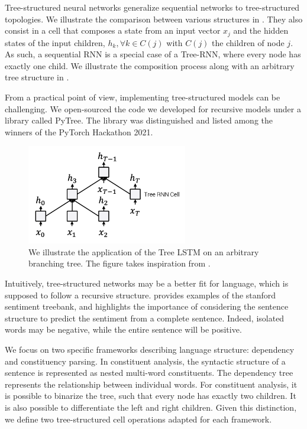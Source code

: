 Tree-structured neural networks generalize sequential networks to tree-structured topologies. We illustrate the comparison between various structures in . They also consist in a cell that composes a state from an input vector $x_j$ and the hidden states of the input children, $h_k, \forall k \in C(j)$ with $C(j)$ the children of node $j$. As such, a sequential RNN is a special case of a Tree-RNN, where every node has exactly one child. We illustrate the composition process along with an arbitrary tree structure in .

From a practical point of view, implementing tree-structured models can be challenging. We open-sourced the code we developed for recursive models under a library called PyTree. The library was distinguished and listed among the winners of the PyTorch Hackathon 2021.

\begin{figure}[!ht]
	\includegraphics[width=7cm]{images/tree-lstm.png}
	\caption[Tree LSTM]{We illustrate the application of the Tree LSTM on an arbitrary branching tree. The figure takes inspiration from \textcite{tai_15}.}
\end{figure}

Intuitively, tree-structured networks may be a better fit for language, which is supposed to follow a recursive structure.  provides examples of the stanford sentiment treebank, and highlights the importance of considering the sentence structure to predict the sentiment from a complete sentence. Indeed, isolated words may be negative, while the entire sentence will be positive.

We focus on two specific frameworks describing language structure: dependency and constituency parsing. In constituent analysis, the syntactic structure of a sentence is represented as nested multi-word constituents. The dependency tree represents the relationship between individual words. For constituent analysis, it is possible to binarize the tree, such that every node has exactly two children. It is also possible to differentiate the left and right children. Given this distinction, we define two tree-structured cell operations adapted for each framework.

